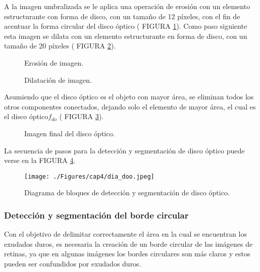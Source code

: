 A la imagen umbralizada se le aplica una operación de erosión con  un elemento estructurante con forma de disco, con un tamaño de 12 píxeles, con el fin de acentuar la forma circular del disco óptico ( FIGURA \ref{fig:disco_5}). Como paso siguiente esta imagen se dilata  con un elemento estructurante en forma de disco, con un tamaño de 20 píxeles ( FIGURA \ref{fig:disco_6}).
\begin{figure}[H]
\centering
{}
\caption{Erosión de imagen.} \label{fig:disco_5}
\end{figure}

\begin{figure}[H]
\centering
{}
\caption{Dilatación de imagen.} \label{fig:disco_6}
\end{figure}

Asumiendo que el disco óptico es el objeto con mayor área, se eliminan todos los otros componentes conectados, dejando solo el elemento de mayor área, el cual es el  disco óptico$f_{do}$ ( FIGURA \ref{fig:disco_7}).

\begin{figure}[H]
\centering
{}
\caption{Imagen final del disco óptico.} \label{fig:disco_7}
\end{figure}


 La secuencia de pasos para la detección y segmentación de disco óptico puede verse en la FIGURA \ref{fig:diado}.

\begin{figure}[H]
	\centering
		\texttt{[image: ./Figures/cap4/dia\_doo.jpeg]}
	\caption{Diagrama de bloques de detección y segmentación de disco óptico.}
	\label{fig:diado}
\end{figure}

\subsubsection{Detección y segmentación del borde circular}
Con el objetivo de delimitar correctamente el área en la cual se encuentran los exudados duros, es  necesaria  la creación de un borde circular de las imágenes de retinas, ya que en algunas imágenes los bordes circulares son más claros y estos pueden ser confundidos por exudados duros.

